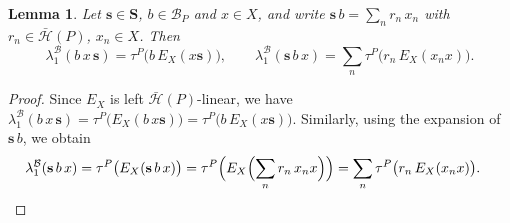 \documentclass[11pt, reqno]{amsart}
\newcommand{\cB}{\mathcal{B}}
\newcommand{\cH}{\mathcal{H}}
\numberwithin{equation}{section}
\newtheorem{lemma}[theorem]{Lemma}
\theoremstyle{remark}
\begin{document}
\begin{lemma}\label{lem:othergens}
	Let $\mathbf s\in\mathbf S$, $b\in\cB_P$ and $x\in X$, and write $\mathbf s\,b=\sum_{n}r_n\,x_n$ with $r_n\in\bar{\cH}(P)$, $x_n\in X$. Then
	\[
	\lambda_1^{\cB}(b\,x\,\mathbf s)=\tau^P\bigl(b\,E_X(x\mathbf s)\bigr),\qquad
	\lambda_1^{\cB}(\mathbf s\,b\,x)=\sum_n\tau^P\bigl(r_n\,E_X(x_nx)\bigr).
	\]
\end{lemma}
\begin{proof}
	Since $E_X$ is left $\bar{\cH}(P)$-linear, we have
	$
	\lambda_1^{\cB}(b\,x\,\mathbf s)=\tau^P\bigl(E_X(b\,x\mathbf s)\bigr)=\tau^P\bigl(b\,E_X(x\mathbf s)\bigr).
	$
	Similarly, using the expansion of $\mathbf s\,b$, we obtain
	\[
	\begin{aligned}
		\lambda_1^{\cB}(\mathbf s\,b\,x)
		&=\tau^P\bigl(E_X(\mathbf s\,b\,x)\bigr)
		=\tau^P\Bigl(E_X\Bigl(\sum_n r_n\,x_nx\Bigr)\Bigr)
		=\sum_n\tau^P\bigl(r_n\,E_X(x_nx)\bigr).
	\end{aligned}
	\]
\end{proof}
\end{document}
